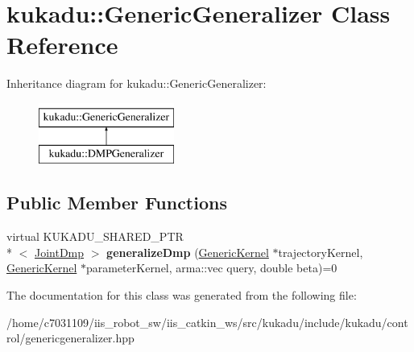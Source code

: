 \hypertarget{classkukadu_1_1GenericGeneralizer}{\section{kukadu\-:\-:Generic\-Generalizer Class Reference}
\label{classkukadu_1_1GenericGeneralizer}
}
Inheritance diagram for kukadu\-:\-:Generic\-Generalizer\-:\begin{figure}[H]
\begin{center}
\leavevmode
\includegraphics[height=2.000000cm]{classkukadu_1_1GenericGeneralizer}
\end{center}
\end{figure}
\subsection*{Public Member Functions}
\begin{DoxyCompactItemize}
\item 
\hypertarget{classkukadu_1_1GenericGeneralizer_a39874ac4acbf59957ba81f3ba2f620cd}{virtual K\-U\-K\-A\-D\-U\-\_\-\-S\-H\-A\-R\-E\-D\-\_\-\-P\-T\-R\\*
$<$ \hyperlink{classkukadu_1_1JointDmp}{Joint\-Dmp} $>$ {\bfseries generalize\-Dmp} (\hyperlink{classkukadu_1_1GenericKernel}{Generic\-Kernel} $\ast$trajectory\-Kernel, \hyperlink{classkukadu_1_1GenericKernel}{Generic\-Kernel} $\ast$parameter\-Kernel, arma\-::vec query, double beta)=0}\label{classkukadu_1_1GenericGeneralizer_a39874ac4acbf59957ba81f3ba2f620cd}

\end{DoxyCompactItemize}


The documentation for this class was generated from the following file\-:\begin{DoxyCompactItemize}
\item 
/home/c7031109/iis\-\_\-robot\-\_\-sw/iis\-\_\-catkin\-\_\-ws/src/kukadu/include/kukadu/control/genericgeneralizer.\-hpp\end{DoxyCompactItemize}
